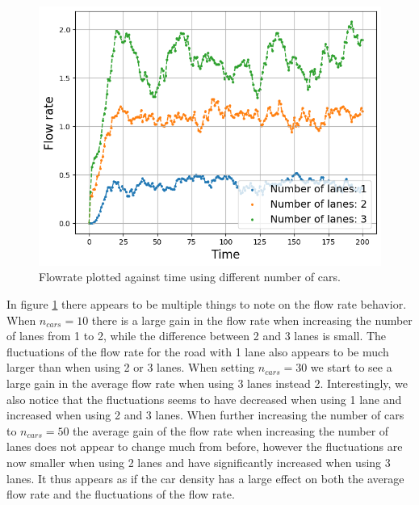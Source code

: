 \documentclass[a4paper,12pt]{article}
\begin{document}
\begin{figure}[H]
\begin{minipage}{.5\textwidth}
    \end{minipage}
    \centering
    \begin{minipage}{.5\textwidth}
        \centering
        \includegraphics[scale=0.47]{Images/flowrate time 50 cars.png}
    \end{minipage}%
    \caption{Flowrate plotted against time using different number of cars.}
    \label{flowrate}
\end{figure}
In figure \ref*{flowrate} there appears to be multiple things to note on the flow rate behavior. When $n_{cars}=10$ there is a large gain in the flow rate when increasing
the number of lanes from 1 to 2, while the difference between 2 and 3 lanes is small. The fluctuations of the flow rate for the road with 1 lane also
appears to be much larger than when using 2 or 3 lanes. When setting $n_{cars}=30$ we start to see a large gain in the average flow rate when using 3 lanes instead 2.
Interestingly, we also notice that the fluctuations seems to have decreased when using 1 lane and increased when using 2 and 3 lanes. 
When further increasing the number of cars to $n_{cars} = 50$ the average gain of the flow rate when increasing the number of lanes
does not appear to change much from before, however the fluctuations are now smaller when using 2 lanes and have significantly increased when using 3 lanes.
It thus appears as if the car density has a large effect on both the average flow rate and the fluctuations of the flow rate.
\end{document}

